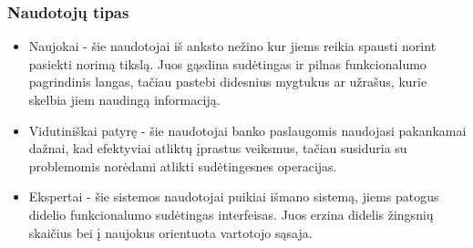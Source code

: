 \documentclass{VUMIFPSkursinis}
\begin{document}
\subsubsection{Naudotojų tipas}
\begin{itemize}
	\item Naujokai - šie naudotojai iš anksto nežino kur jiems reikia spausti norint pasiekti norimą tikslą. Juos gąsdina sudėtingas ir pilnas funkcionalumo pagrindinis langas, tačiau pastebi didesnius mygtukus ar užrašus, kurie skelbia jiem naudingą informaciją.
	\item Vidutiniškai patyrę - šie naudotojai banko paslaugomis naudojasi pakankamai dažnai, kad efektyviai atliktų įprastus veiksmus, tačiau susiduria su problemomis norėdami atlikti sudėtingesnes operacijas.
	\item Ekspertai - šie sistemos naudotojai puikiai išmano sistemą, jiems patogus didelio funkcionalumo sudėtingas interfeisas. Juos erzina didelis žingsnių skaičius bei į naujokus orientuota vartotojo sąsaja.
\end{itemize}
\end{document}
